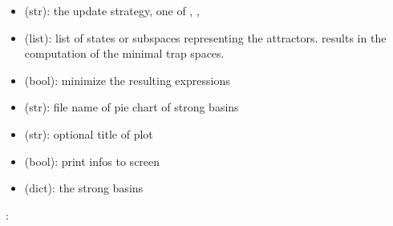 \documentclass[letterpaper,10pt,english]{sphinxmanual}
\begin{document}
\begin{fulllineitems}
\begin{description}
\begin{itemize}
\item {} 
 (str): the update strategy, one of , , 

\item {} 
 (list): list of states or subspaces representing the attractors.  results in the computation of the minimal trap spaces.

\item {} 
 (bool): minimize the resulting expressions

\item {} 
 (str): file name of pie chart of strong basins

\item {} 
 (str): optional title of plot

\item {} 
 (bool): print infos to screen

\end{itemize}

\item[{\sphinxstylestrong{returns}::}] \leavevmode\begin{itemize}
\item {} 
 (dict): the strong basins

\end{itemize}

\end{description}

:

\begin{sphinxVerbatim}[commandchars=\\\{\}]
  
 
\end{sphinxVerbatim}

\end{fulllineitems}
\end{document}
